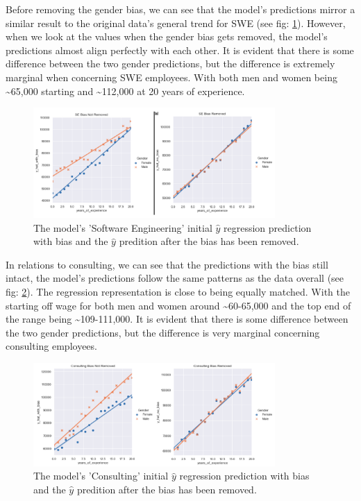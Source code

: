 \documentclass{sigchi}
\begin{document}
	Before removing the gender bias, we can see that the model's predictions mirror a similar result to the original data's general trend for SWE (see fig: \ref{fig:se_comparison}).  However, when we look at the values when the gender bias gets removed, the model's predictions almost align perfectly with each other. It is evident that there is some difference between the two gender predictions, but the difference is extremely marginal when concerning SWE employees. With both men and women being \textasciitilde{65,000} starting and \textasciitilde{112,000} at 20 years of experience.
	
	\begin{figure}[h]
		\includegraphics[width=9.2cm]{se_comparison.png}
		\caption{The model's 'Software Engineering' initial $\hat{y}$ regression prediction with bias and the $\hat{y}$ predition after the bias has been removed.}
		\label{fig:se_comparison}
		\centering
	\end{figure}

	In relations to consulting, we can see that the predictions with the bias still intact, the model's predictions follow the same patterns as the data overall (see fig: \ref{fig:consulting_comparison}).  The regression representation is close to being equally matched. With the starting off wage for both men and women around \textasciitilde{60-65,000} and the top end of the range being \textasciitilde{109-111,000}. It is evident that there is some difference between the two gender predictions, but the difference is very marginal concerning consulting employees. 

	\begin{figure}[h]
		\includegraphics[width=9.2cm]{consulting_comparison.png}
		\caption{The model's 'Consulting' initial $\hat{y}$ regression prediction with bias and the $\hat{y}$ predition after the bias has been removed.}
		\label{fig:consulting_comparison}
		\centering
	\end{figure}
\end{document}
